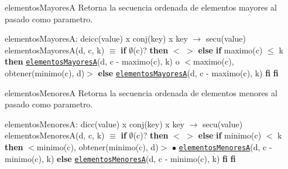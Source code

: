 \begin{DoxyParagraph}{elementos\+MayoresA}
Retorna la secuencia ordenada de elementos mayores al pasado como parametro.

elementos\+MayoresA\+: deicc(value) x conj(key) x key $\to$ secu(value)~\newline
 elementos\+Mayores\+A(d, c, k) $\equiv$ {\bfseries if} $\emptyset$(c)? {\bfseries then} $<$ $>$ {\bfseries else} {\bfseries if} maximo(c) $\leq$ k {\bfseries then} \href{axiomas.html#elementosMayoresA}{\tt elementos\+MayoresA}(d, c -\/ maximo(c), k) o $<$maximo(c), obtener(minimo(c), d)$>$ {\bfseries else} \href{axiomas.html#elementosMayoresA}{\tt elementos\+MayoresA}(d, c -\/ maximo(c), k) {\bfseries fi} {\bfseries fi} 
\end{DoxyParagraph}


\begin{DoxyParagraph}{elementos\+MenoresA}
Retorna la secuencia ordenada de elementos menores al pasado como parametro.

elementos\+MenoresA\+: dicc(value) x conj(key) x key $\to$ secu(value)~\newline
 elementos\+Menores\+A(d, c, k) $\equiv$ {\bfseries if} $\emptyset$(c)? {\bfseries then} $<$ $>$ {\bfseries else} {\bfseries if} minimo(c) $<$ k {\bfseries then} $<$minimo(c), obtener(minimo(c), d)$>$ $\bullet$ \href{axiomas.html#elementosMenoresA}{\tt elementos\+MenoresA}(d, c -\/ minimo(c), k) {\bfseries else} \href{axiomas.html#elementosMenoresA}{\tt elementos\+MenoresA}(d, c -\/ minimo(c), k) {\bfseries fi} {\bfseries fi} 
\end{DoxyParagraph}

